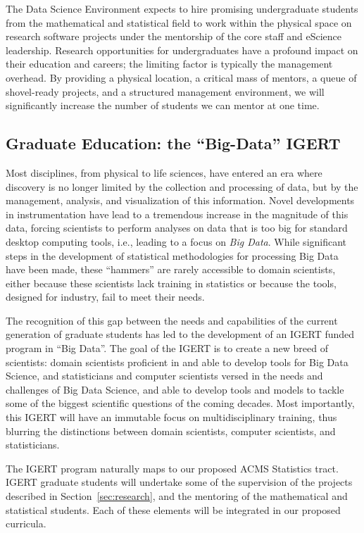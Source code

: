 The Data Science Environment expects to hire promising undergraduate students from the mathematical and statistical field to work within the physical space on research software projects under the mentorship of the core staff and eScience leadership.  Research opportunities for undergraduates have a profound impact on their education and careers; the limiting factor is typically the management overhead.  By providing a physical location, a critical mass of mentors, a queue of shovel-ready projects, and a structured management environment, we will significantly increase the number of students we can mentor at one time.

\subsection{Graduate Education: the ``Big-Data'' IGERT}

Most disciplines, from physical to life sciences, have entered an era where discovery is no longer limited by the collection and processing of data, but by the management, analysis, and visualization of this information. Novel developments in instrumentation have lead to a tremendous increase in the magnitude of this data, forcing scientists to perform analyses on data that is too big for standard desktop computing tools, i.e., leading to a focus on \emph{Big Data}.   While significant steps in the development of statistical methodologies for processing Big Data have been made, these ``hammers'' are rarely accessible to domain scientists, either because these scientists lack training in statistics or because the tools, designed for industry, fail to meet their needs.

The recognition of this gap between the needs and capabilities of the current generation of graduate students has led to the development of an IGERT funded program in ``Big Data''.  The goal of the IGERT is to create a new breed of scientists: domain scientists proficient in and able to develop tools for Big Data Science, and statisticians and computer scientists versed in the needs and challenges of Big Data Science, and able to develop tools and models to tackle some of the biggest scientific questions of the coming decades.  Most importantly, this IGERT will have an immutable focus on multidisciplinary training, thus blurring the distinctions between domain scientists, computer scientists, and statisticians.

The IGERT program naturally maps to our proposed ACMS Statistics tract. IGERT graduate students will undertake some of the supervision of the projects described in Section~\ref{sec:research}, and the mentoring of the mathematical and statistical students. Each of these elements will be integrated in our proposed curricula. 
